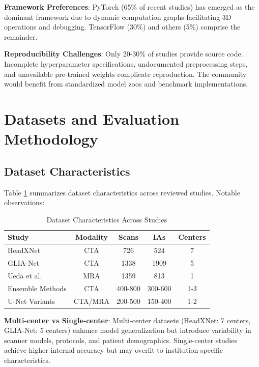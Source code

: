 \documentclass[conference]{IEEEtran}
\begin{document}
\textbf{Framework Preferences}: PyTorch (65\% of recent studies) has emerged as the dominant framework due to dynamic computation graphs facilitating 3D operations and debugging. TensorFlow (30\%) and others (5\%) comprise the remainder.

\textbf{Reproducibility Challenges}: Only 20-30\% of studies provide source code. Incomplete hyperparameter specifications, undocumented preprocessing steps, and unavailable pre-trained weights complicate reproduction. The community would benefit from standardized model zoos and benchmark implementations.

\section{Datasets and Evaluation Methodology}

\subsection{Dataset Characteristics}

Table \ref{tab:datasets} summarizes dataset characteristics across reviewed studies. Notable observations:

\begin{table}[htbp]
\caption{Dataset Characteristics Across Studies}
\begin{center}
\begin{tabular}{|l|c|c|c|c|}
\hline
\textbf{Study} & \textbf{Modality} & \textbf{Scans} & \textbf{IAs} & \textbf{Centers} \\
\hline
HeadXNet & CTA & 726 & 524 & 7 \\
\hline
GLIA-Net & CTA & 1338 & 1909 & 5 \\
\hline
Ueda et al. & MRA & 1359 & 813 & 1 \\
\hline
Ensemble Methods & CTA & 400-800 & 300-600 & 1-3 \\
\hline
U-Net Variants & CTA/MRA & 200-500 & 150-400 & 1-2 \\
\hline
\end{tabular}
\label{tab:datasets}
\end{center}
\end{table}

\textbf{Multi-center vs Single-center}: Multi-center datasets (HeadXNet: 7 centers, GLIA-Net: 5 centers) enhance model generalization but introduce variability in scanner models, protocols, and patient demographics. Single-center studies achieve higher internal accuracy but may overfit to institution-specific characteristics.
\end{document}
